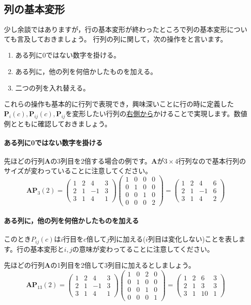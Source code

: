 \documentclass{ltjsbook}
\begin{document}
\subsection{列の基本変形}
少し余談ではありますが，行の基本変形が終わったところで列の基本変形についても言及しておきましょう。
行列の列に関して，次の操作をと言います。
\begin{enumerate}
	\item ある列に0ではない数字を掛ける。
	\item ある列に，他の列を何倍かしたものを加える。
	\item 二つの列を入れ替える。
\end{enumerate}
これらの操作も基本的に行列で表現でき，興味深いことに行の時に定義した$\bm{P}_i(c), \bm{P}_{ij}(c), \bm{P}_{ij}$を変形したい行列の\underline{右側から}かけることで実現します。数値例とともに確認しておきましょう。
\paragraph{ある列に0ではない数字を掛ける}
先ほどの行列$\bm{A}$の3列目を2倍する場合の例です。$\bm{A}$が$3 \times 4$行列なので基本行列のサイズが変わっていることに注意してください。
\[
	\bm{A} \bm{P}_3(2)=
	\begin{pmatrix} 1 & 2 & 4 & 3 \\ 2 & 1 & -1 & 3 \\ 3 & 1 & 4 & 1 \end{pmatrix}
	\begin{pmatrix} 1 & 0 & 0 & 0\\ 0 & 1 & 0 & 0\\ 0 & 0 & 1 & 0 \\ 0 & 0 & 0 & 2 \end{pmatrix}
	=
	\begin{pmatrix} 1 & 2 & 4 & 6 \\ 2 & 1 & -1 & 6 \\ 3 & 1 & 4 & 2 \end{pmatrix}
\]

\paragraph{ある列に，他の列を何倍かしたものを加える}
このとき$P_{ij}(c)$は$i$行目を$c$倍して$j$列に加える($i$列目は変化しない)ことを表します。行の基本変形と$i,j$の意味が変わってることに注意してください。

先ほどの行列$\bm{A}$の1列目を2倍して3列目に加えるとしましょう。
\[
	\bm{A} \bm{P}_{13}(2)=
	\begin{pmatrix} 1 & 2 & 4 & 3 \\ 2 & 1 & -1 & 3 \\ 3 & 1 & 4 & 1 \end{pmatrix}
	\begin{pmatrix} 1 & 0 & 2 & 0\\ 0 & 1 & 0 & 0\\ 0 & 0 & 1 & 0 \\ 0 & 0 & 0 & 1\end{pmatrix}
	=
	\begin{pmatrix} 1 & 2 & 6 & 3 \\ 2 & 1 & 3 & 3 \\ 3 & 1 & 10 & 1 \end{pmatrix}
\]
\end{document}
